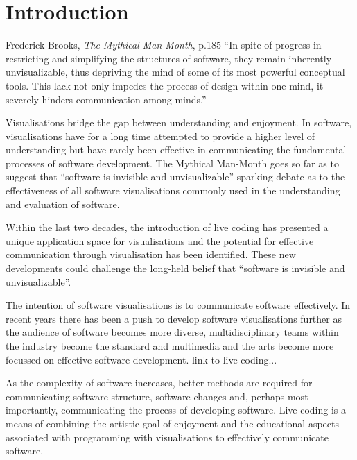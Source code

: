 
\chapter{Introduction}
\label{chap:introduction}

\begin{chapquote}{Frederick Brooks, \textit{The Mythical Man-Month}, p.185}
``In spite of progress in restricting and simplifying the structures of software, they remain inherently unvisualizable, thus depriving the mind of some of its most powerful conceptual tools. This lack not only impedes the process of design within one mind, it severely hinders communication among minds.''
\end{chapquote}

Visualisations bridge the gap between understanding and enjoyment. In software, visualisations have for a long time attempted to provide a higher level of understanding but have rarely been effective in communicating the fundamental processes of software development. The Mythical Man-Month goes so far as to suggest that ``software is invisible and unvisualizable''\cite{Brooks1995} sparking debate as to the effectiveness of all software visualisations commonly used in the understanding and evaluation of software. 

Within the last two decades, the introduction of live coding has presented a unique application space for visualisations and the potential for effective communication through visualisation has been identified. These new developments could challenge the long-held belief that ``software is invisible and unvisualizable''.

The intention of software visualisations is to communicate software effectively. In recent years there has been a push to develop software visualisations further as the audience of software becomes more diverse, multidisciplinary teams within the industry become the standard and multimedia and the arts become more focussed on effective software development. {\color{red} link to live coding...}


As the complexity of software increases, better methods are required for communicating software structure, software changes and, perhaps most importantly, communicating the process of developing software. Live coding is a means of combining the artistic goal of enjoyment and the educational aspects associated with programming with visualisations to effectively communicate software.

